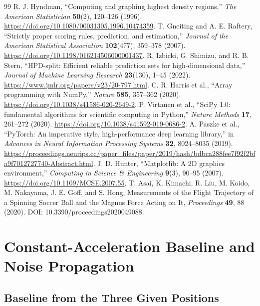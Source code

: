 \documentclass[11pt,a4paper]{article}
\begin{document}
\begin{thebibliography}{99}
 R. J. Hyndman, ``Computing and graphing highest density regions,'' \emph{The American Statistician} \textbf{50}(2), 120--126 (1996). \url{https://doi.org/10.1080/00031305.1996.10474359}.
 T. Gneiting and A. E. Raftery, ``Strictly proper scoring rules, prediction, and estimation,'' \emph{Journal of the American Statistical Association} \textbf{102}(477), 359--378 (2007). \url{https://doi.org/10.1198/016214506000001437}.
 R. Izbicki, G. Shimizu, and R. B. Stern, ``HPD-split: Efficient reliable prediction sets for high-dimensional data,'' \emph{Journal of Machine Learning Research} \textbf{23}(130), 1--45 (2022). \url{https://www.jmlr.org/papers/v23/20-797.html}.
 C. R. Harris et al., ``Array programming with NumPy,'' \emph{Nature} \textbf{585}, 357--362 (2020). \url{https://doi.org/10.1038/s41586-020-2649-2}.
 P. Virtanen et al., ``SciPy 1.0: fundamental algorithms for scientific computing in Python,'' \emph{Nature Methods} \textbf{17}, 261--272 (2020). \url{https://doi.org/10.1038/s41592-019-0686-2}.
 A. Paszke et al., ``PyTorch: An imperative style, high-performance deep learning library,'' in \emph{Advances in Neural Information Processing Systems} \textbf{32}, 8024--8035 (2019). \url{https://proceedings.neurips.cc/paper_files/paper/2019/hash/bdbca288fee7f92f2bfa9f7012727740-Abstract.html}.
 J. D. Hunter, ``Matplotlib: A 2D graphics environment,'' \emph{Computing in Science \& Engineering} \textbf{9}(3), 90--95 (2007). \url{https://doi.org/10.1109/MCSE.2007.55}.
T. Asai, K. Kimachi, R. Liu, M. Koido, M. Nakayama, J. E. Goff, and S. Hong,
Measurements of the Flight Trajectory of a Spinning Soccer Ball and the Magnus Force Acting on It,
\emph{Proceedings} \textbf{49}, 88 (2020). DOI: 10.3390/proceedings2020049088.
\end{thebibliography}

\appendix
\section{Constant-Acceleration Baseline and Noise Propagation}
\label{app:noise}

\subsection{Baseline from the Three Given Positions}
\end{document}

